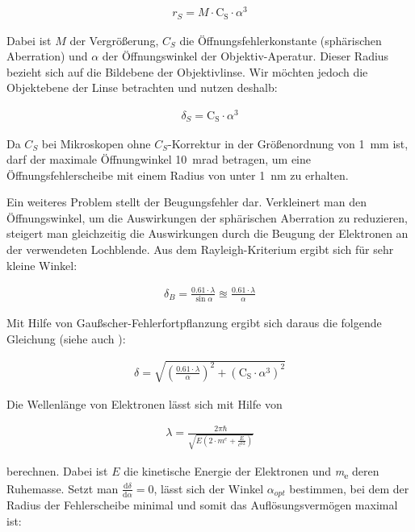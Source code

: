 \documentclass[
	paper=a4,				%
	twoside=true,			%
	BCOR=6mm,				%
	fontsize=12pt,			%
	pagesize=auto,			%
	numbers=noenddot,		%
	bibliography=totoc,		%
	draft=false
]{scrartcl}
\begin{document}
\begin{align}
r_S = M \cdot \text{C}_\text{S}\cdot\alpha^3
\end{align}

Dabei ist $M$ der Vergrößerung, $C_S$ die Öffnungsfehlerkonstante (sphärischen Aberration) und $\alpha$ der Öffnungswinkel der Objektiv-Aperatur. Dieser Radius bezieht sich auf die Bildebene der Objektivlinse. Wir möchten jedoch die Objektebene der Linse betrachten und nutzen deshalb:

\begin{align}
\delta_S = \text{C}_\text{S}\cdot\alpha^3 \label{eq:delta_S}
\end{align}

Da $C_S$ bei Mikroskopen ohne $C_S$-Korrektur in der Größenordnung von \SI{1}{mm} ist, darf der maximale Öffnungwinkel \SI{10}{mrad} betragen, um eine Öffnungsfehlerscheibe mit einem Radius von unter \SI{1}{nm} zu erhalten.

Ein weiteres Problem stellt der Beugungsfehler dar. Verkleinert man den Öffnungswinkel, um die Auswirkungen der sphärischen Aberration zu reduzieren, steigert man gleichzeitig die Auswirkungen durch die Beugung der Elektronen an der verwendeten Lochblende. Aus dem Rayleigh-Kriterium ergibt sich für sehr kleine Winkel:

\begin{align}
\delta_B = \frac{\num{0,61}\cdot\lambda}{\sin\alpha} \approxeq \frac{\num{0,61}\cdot\lambda}{\alpha} \label{eq:delta_B}
\end{align}

Mit Hilfe von Gaußscher-Fehlerfortpflanzung ergibt sich daraus die folgende Gleichung (siehe auch \cite[S.\,28]{thomas_analytische_2013}):

\begin{align}
\delta = \sqrt{\left(\frac{\num{0,61}\cdot\lambda}{\alpha}\right)^2 + \left(\text{C}_\text{S}\cdot\alpha^3\right)^2}\label{eq:delta_TG}
\end{align}

Die Wellenlänge von Elektronen lässt sich mit Hilfe von

\begin{align}
\lambda = \frac{2\pi\si{\planckbar}}{\sqrt{E \left( 2 \cdot \si{\electronmass} + \frac{E}{\si{\clight^2}}\right)}}
\end{align}

berechnen. Dabei ist $E$ die kinetische Energie der Elektronen und \si{\electronmass} deren Ruhemasse. Setzt man $\frac{\mathrm d\delta}{\mathrm d\alpha} = 0$, lässt sich der Winkel $\alpha_{opt}$ bestimmen, bei dem der Radius der Fehlerscheibe minimal und somit das Auflösungsvermögen maximal ist:
\end{document}

